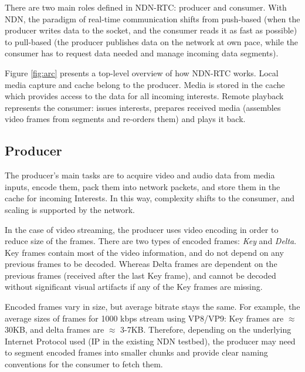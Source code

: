 \documentclass{icn/sig-alternate-2012} %
\newcommand{\ndnrtcName}{NDN-RTC} %
\begin{document}
There are two main roles defined in \ndnrtcName{}: producer and consumer. With NDN, the paradigm of real-time communication shifts from push-based (when the producer writes data to the socket, and the consumer reads it as fast as possible) to pull-based (the producer publishes data on the network at own pace, while the consumer has to request data needed and manage incoming data segments).

%

Figure \ref{fig:arc} presents a top-level overview of how \ndnrtcName{} works. Local media capture and cache belong to the producer. Media is stored in the cache which provides access to the data for all incoming interests. Remote playback represents the consumer: issues interests, prepares received media (assembles video frames from segments and re-orders them) and plays it back.

\subsection{Producer}
The producer's main tasks are to acquire video and audio data from media inputs, encode them, pack them into network packets, and store them in the cache for incoming Interests. In this way, complexity shifts to the consumer, and scaling is supported by the network.

In the case of video streaming, the producer uses video encoding in order to reduce size of the frames. There are two types of encoded frames: \textit{Key} and \textit{Delta}. Key frames contain most of the video information, and do not depend on any previous frames to be decoded. Whereas Delta frames are dependent on the previous frames (received after the last Key frame), and cannot be decoded without significant visual artifacts if any of the Key frames are missing.

Encoded frames vary in size, but average bitrate stays the same. For example, the average sizes of frames for 1000 kbps stream using VP8/VP9: Key frames are $\approx$ 30KB, and delta frames are $\approx$ 3-7KB.
Therefore, depending on the underlying Internet Protocol used (IP in the existing NDN testbed), the producer may need to segment encoded frames into smaller chunks and provide clear naming conventions for the consumer to fetch them.
\end{document}
